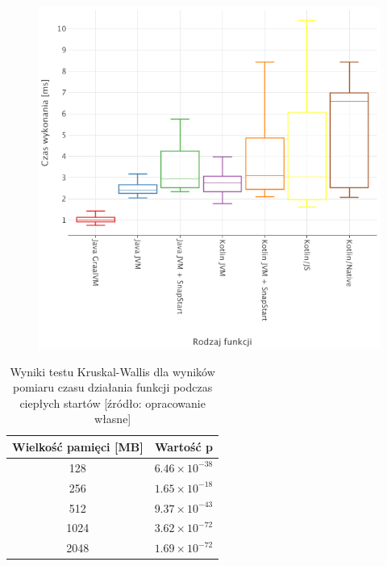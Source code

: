 \begin{figure}[h]
    \begin{minipage}[t]{0.48\textwidth}
        \centering
        \includegraphics[width=\linewidth]{charts/results/warm-start-boxplot-1024.png}
        \label{fig:warm_start_1024} %
    \end{minipage}
\end{figure}

\begin{table}[H]
    \centering
    \caption{Wyniki testu Kruskal-Wallis dla wyników pomiaru czasu działania funkcji podczas ciepłych startów [źródło: opracowanie własne]}
    \begin{tabular}{|c|c|}
    \hline
    \textbf{Wielkość pamięci [MB]} & \textbf{Wartość p} \\
    \hline
    128 & $6.46 \times 10^{-38}$ \\
    \hline
    256 & $1.65 \times 10^{-18}$ \\
    \hline
    512 & $9.37 \times 10^{-43}$ \\
    \hline
    1024 & $3.62 \times 10^{-72}$ \\
    \hline
    2048 & $1.69 \times 10^{-72}$ \\
    \hline
    \end{tabular}
    \label{table:kruskal_wallis_test_warm_starts}
\end{table}

